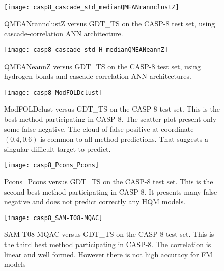 \begin{figure}[H]
	\begin{center}
		\texttt{[image: casp8\_cascade\_std\_medianQMEANrannclustZ]}
		\caption[QMEANrannclustZ versus GDT\_TS on the CASP-8 test set, using ca\-sca\-de-\-cor\-re\-la\-tion ANN architecture]{QMEANrannclustZ versus GDT\_TS on the CASP-8 test set, using ca\-sca\-de-\-cor\-re\-la\-tion ANN architecture.}
		\label{fig:casp8_cascade_std_median_qmeanrannclustZ}
	\end{center}
\end{figure}

\begin{figure}[H]
	\begin{center}
		\texttt{[image: casp8\_cascade\_std\_H\_medianQMEANeannZ]}
		\caption[QMEANeannZ versus GDT\_TS on the CASP-8 test set, using hydrogen bonds and ca\-sca\-de-\-cor\-re\-la\-tion ANN architectures]{QMEANeannZ versus GDT\_TS on the CASP-8 test set, using hydrogen bonds and ca\-sca\-de-\-cor\-re\-la\-tion ANN architectures.}
		\label{fig:casp8_cascade_std_H_median_qmeaneannZ}
	\end{center}
\end{figure}

\begin{figure}[H]
	\begin{center}
		\texttt{[image: casp8\_ModFOLDclust]}
		\caption[ModFOLDclust versus GDT\_TS on the CASP-8 test set]{ModFOLDclust versus GDT\_TS on the CASP-8 test set. This is the best method participating in CASP-8. The scatter plot present only some false negative. The cloud of false positive at coordinate $(0.4, 0.6)$ is common to all method predictions. That suggests a singular difficult target to predict.}
		\label{fig:casp8_modfoldclust}
	\end{center}
\end{figure}

\begin{figure}[H]
	\begin{center}
		\texttt{[image: casp8\_Pcons\_Pcons]}
		\caption[Pcons\_Pcons versus GDT\_TS on the CASP-8 test set]{Pcons\_Pcons versus GDT\_TS on the CASP-8 test set. This is the second best method participating in CASP-8. It presents many false negative and does not predict correctly any HQM models.}
		\label{fig:casp8_pcons_pcons}
	\end{center}
\end{figure}

\begin{figure}[H]
	\begin{center}
		\texttt{[image: casp8\_SAM-T08-MQAC]}
		\caption[SAM-T08-MQAC versus GDT\_TS on the CASP-8 test set]{SAM-T08-MQAC versus GDT\_TS on the CASP-8 test set. This is the third best method participating in CASP-8. The correlation is linear and well formed. However there is not high accuracy for FM models}
		\label{fig:casp8_sam-t08-mqac}
	\end{center}
\end{figure}






\cleardoublepage
